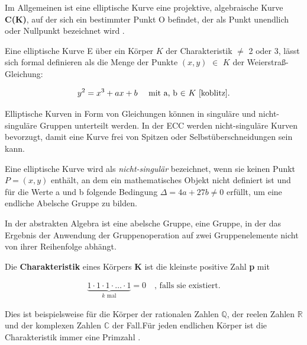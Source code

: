 Im Allgemeinen ist eine elliptische Kurve eine projektive, algebraische Kurve \textbf{C(K)}, auf der sich ein bestimmter Punkt O befindet, der als Punkt unendlich oder Nullpunkt bezeichnet wird \cite{GaMoDa}.


Eine elliptische Kurve E über ein Körper $ K $ der Charakteristik $ \neq $
2 oder 3, lässt sich formal definieren als die Menge der Punkte
$ (x, y) $ $ \in $ \( K \)  der Weierstraß-Gleichung:

\begin{ceqn}

\begin{equation}
       y^2 = x^3 + ax + b \quad 
       \text{ mit a, b $ \in $ $ K $           \cite{koblitz}.}
\end{equation} 

\end{ceqn}

Elliptische Kurven in Form von Gleichungen können in singuläre und nicht-singuläre Gruppen unterteilt werden. In der ECC werden nicht-singuläre Kurven bevorzugt, damit eine Kurve frei von Spitzen oder Selbstüberschneidungen sein kann\cite{razad}.

Eine elliptische Kurve wird als \textit{nicht-singulär} bezeichnet,
wenn sie keinen Punkt $ P = (x, y) $ enthält, an dem ein mathematisches Objekt nicht definiert ist \cite{werner} und für die Werte a und b folgende Bedingung
 $ \Delta = 4a + 27b \neq 0 $
 erfüllt, um eine endliche Abelsche Gruppe zu bilden. 
 
In der abstrakten Algebra ist eine abelsche Gruppe, eine Gruppe, in der das Ergebnis der Anwendung der Gruppenoperation auf zwei Gruppenelemente nicht von ihrer Reihenfolge abhängt.


Die \textbf{Charakteristik} eines Körpers $ \mathbf{K} $ ist die kleinste positive Zahl \textbf{p} mit 
\begin{ceqn}
\begin{align*}
   \underbrace{1 \cdot 1 \cdot 1 \cdot \ldots \cdot 1}_{\text{$k$ mal} } = 0   \quad \text{, falls sie existiert.}
\end{align*}
\end{ceqn}
 
Dies ist beispielsweise für die Körper der rationalen Zahlen $ \mathbb{Q} $, der reelen Zahlen $ \mathbb{R} $ und der komplexen Zahlen $\mathbb{C} $ der Fall.Für jeden endlichen Körper ist die Charakteristik immer eine Primzahl \cite{damer}.

